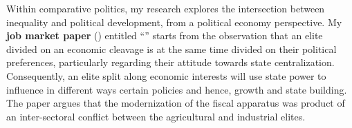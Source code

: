 \documentclass[11pt]{letter} %
\begin{document}
\begin{letter}{}
\vspace{-1.5cm}Within comparative politics, my research explores the intersection between inequality and political development, from a political economy perspective. My {\bf job market paper} (\emph{\unskip}) entitled ``\href{https://github.com/hbahamonde/IncomeTaxAdoption/raw/master/Bahamonde_IncomeTaxAdoption.pdf}{\unskip}'' starts from the observation that an elite divided on an economic cleavage is at the same time divided on their political preferences, particularly regarding their attitude towards state centralization. Consequently, an elite split along economic interests will use state power to influence in different ways certain policies and hence, growth and state building. The paper argues that the modernization of the fiscal apparatus was product of an inter-sectoral conflict between the agricultural and industrial elites. 


\end{letter}
\end{document}

